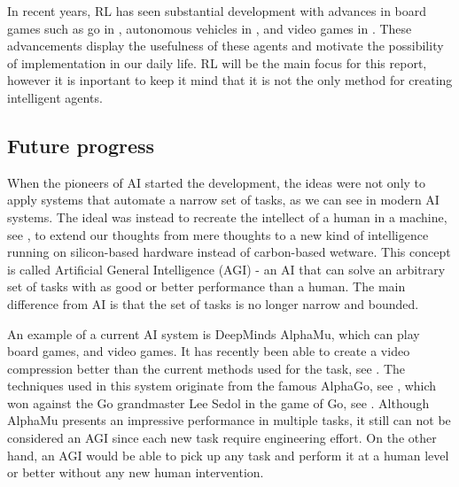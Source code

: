 \documentclass[12pt,A4]{report}
\newcommand{\autobaj}{}
\theoremstyle{definition}
\begin{document}
In recent years, RL has seen substantial development with advances in board games such as go in \citet{Silver}, autonomous vehicles in \citet{Levinson}, and video games in \citet{Minh}. These advancements display the usefulness of these agents and motivate the possibility of implementation in our daily life. RL will be the main focus for this report, however it is inportant to keep it mind that it is not the only method for creating intelligent agents. 



\subsection{Future progress}
When the pioneers of AI started the development, the ideas were not only to apply systems that automate a narrow set of tasks, as we can see in modern AI systems. The ideal was instead to recreate the intellect of a human in a machine, see \citet{Dartmouth}, to extend our thoughts from mere thoughts to a new kind of intelligence running on silicon-based hardware instead of carbon-based wetware. This concept is called Artificial General Intelligence (AGI) - an AI that can solve an arbitrary set of tasks with as good or better performance than a human. The main difference from AI is that the set of tasks is no longer narrow and bounded. %


An example of a current AI system is DeepMinds AlphaMu, which can play board games, and video games. It has recently been able to create a video compression better than the current methods used for the task, see \citet{Mandhane}. The techniques used in this system originate from the famous AlphaGo, see \citet{Silver}, which won against the Go grandmaster Lee Sedol in the game of Go, see \citet{DeepMind}. Although AlphaMu presents an impressive performance in multiple tasks, it still can not be considered an AGI since each new task require engineering effort. On the other hand, an AGI would be able to pick up any task and perform it at a human level or better without any new human intervention.
\end{document}
